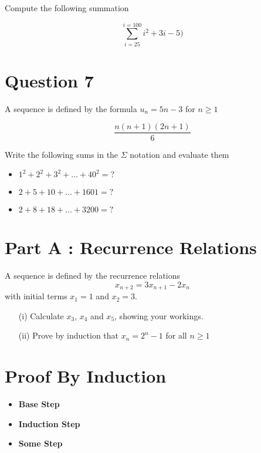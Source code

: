 \documentclass[]{report}
\begin{document}
Compute the following summation

\[ \sum^{i=100}_{i=25} i^2 + 3i -5)\]



\section*{Question 7}
A sequence is defined by the formula 
$u_n = 5n-3$ for $n\geq 1$

\[\frac{n(n+1)(2n+1)}{6}\]

Write the following sums in the $\Sigma$ notation and evaluate them

\begin{itemize}
\item $1^2 + 2^2 + 3^2 +  \ldots +  40^2 = ?$
\item $2 + 5 + 10 + \ldots + 1601 = ?$
\item $2+8+18+\ldots +3200 = ?$
\end{itemize}

\section*{Part A : Recurrence Relations}
A sequence is defined by the recurrence relations
\[x_{n+2}  = 3x_{n+1} - 2x_n\]
with initial terms $x_1 = 1$ and $x_2=3$.

\begin{itemize}
\item[(i)] Calculate $x_3$, $x_4$ and $x_5$, showing your workings.
\item[(ii)] Prove by induction that $x_n = 2^n - 1$ for all $n \geq 1$
\end{itemize}





\section*{Proof By Induction}

\begin{itemize}
\item \textbf{Base Step}
\item \textbf{Induction Step}
\item \textbf{Some Step}
\end{itemize}

\end{document}
